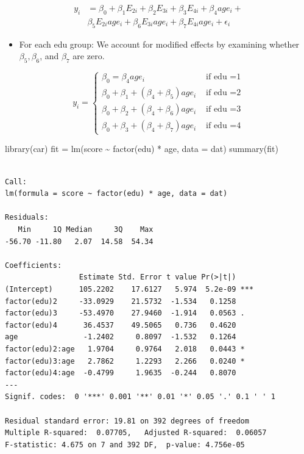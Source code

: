 \documentclass[
  letterpaper,
  DIV=11,
  numbers=noendperiod]{scrreprt}
\newenvironment{Shaded}{\begin{snugshade}}{\end{snugshade}}
\newcommand{\AttributeTok}[1]{\textcolor[rgb]{0.40,0.45,0.13}{#1}}
\newcommand{\FunctionTok}[1]{\textcolor[rgb]{0.28,0.35,0.67}{#1}}
\newcommand{\NormalTok}[1]{\textcolor[rgb]{0.00,0.23,0.31}{#1}}
\newcommand{\OtherTok}[1]{\textcolor[rgb]{0.00,0.23,0.31}{#1}}
\newcommand{\SpecialCharTok}[1]{\textcolor[rgb]{0.37,0.37,0.37}{#1}}
\providecommand{\tightlist}{%
  \setlength{\itemsep}{0pt}\setlength{\parskip}{0pt}}\usepackage{longtable,booktabs,array}
\begin{document}
\[
\begin{align*}
y_i &= \beta_0  +\beta_1 E_{2i} + \beta_2 E_{3i} + \beta_3 E_{4i} + \beta_4 age_i + \\
& \beta_5 E_{2i} age_i + \beta_6 E_{3i} age_i + \beta_7 E_{4i} age_i + \epsilon_i
\end{align*}
\]

\begin{itemize}
\tightlist
\item
  For each edu group: We account for modified effects by examining
  whether \(\beta_5, \beta_6\), and \(\beta_7\) are zero.
\end{itemize}

\[
y_i  = \begin{cases} \beta_0 = \beta_4 age_i &\text{ if edu =1}\\
\beta_0 + \beta_1 + (\beta_4 + \beta_5) age_i& \text{ if edu =2}\\
\beta_0 + \beta_2 + (\beta_4 + \beta_6) age_i &\text{ if edu =3}\\
\beta_0 + \beta_3 + (\beta_4 + \beta_7) age_i &\text{ if edu =4}
\end{cases}
\]

\begin{Shaded}
\begin{Highlighting}[]
\FunctionTok{library}\NormalTok{(car)}
\NormalTok{fit }\OtherTok{=} \FunctionTok{lm}\NormalTok{(score }\SpecialCharTok{\textasciitilde{}} \FunctionTok{factor}\NormalTok{(edu) }\SpecialCharTok{*}\NormalTok{ age, }\AttributeTok{data =}\NormalTok{ dat)}
\FunctionTok{summary}\NormalTok{(fit)}
\end{Highlighting}
\end{Shaded}

\begin{verbatim}

Call:
lm(formula = score ~ factor(edu) * age, data = dat)

Residuals:
   Min     1Q Median     3Q    Max 
-56.70 -11.80   2.07  14.58  54.34 

Coefficients:
                 Estimate Std. Error t value Pr(>|t|)    
(Intercept)      105.2202    17.6127   5.974  5.2e-09 ***
factor(edu)2     -33.0929    21.5732  -1.534   0.1258    
factor(edu)3     -53.4970    27.9460  -1.914   0.0563 .  
factor(edu)4      36.4537    49.5065   0.736   0.4620    
age               -1.2402     0.8097  -1.532   0.1264    
factor(edu)2:age   1.9704     0.9764   2.018   0.0443 *  
factor(edu)3:age   2.7862     1.2293   2.266   0.0240 *  
factor(edu)4:age  -0.4799     1.9635  -0.244   0.8070    
---
Signif. codes:  0 '***' 0.001 '**' 0.01 '*' 0.05 '.' 0.1 ' ' 1

Residual standard error: 19.81 on 392 degrees of freedom
Multiple R-squared:  0.07705,   Adjusted R-squared:  0.06057 
F-statistic: 4.675 on 7 and 392 DF,  p-value: 4.756e-05
\end{verbatim}
\end{document}
